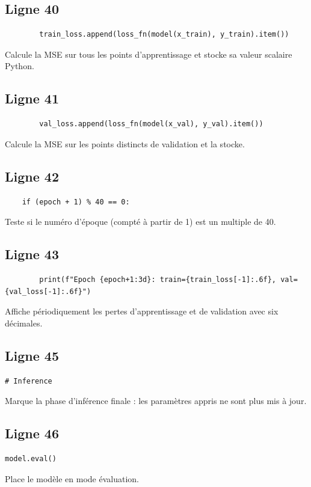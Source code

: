 \documentclass[11pt,a4paper]{article}
\begin{document}
\subsection*{Ligne 40}
\begin{lstlisting}
        train_loss.append(loss_fn(model(x_train), y_train).item())
\end{lstlisting}
Calcule la MSE sur tous les points d'apprentissage et stocke sa valeur scalaire Python.

\subsection*{Ligne 41}
\begin{lstlisting}
        val_loss.append(loss_fn(model(x_val), y_val).item())
\end{lstlisting}
Calcule la MSE sur les points distincts de validation et la stocke.

\subsection*{Ligne 42}
\begin{lstlisting}
    if (epoch + 1) % 40 == 0:
\end{lstlisting}
Teste si le numéro d'époque (compté à partir de 1) est un multiple de 40.

\subsection*{Ligne 43}
\begin{lstlisting}
        print(f"Epoch {epoch+1:3d}: train={train_loss[-1]:.6f}, val={val_loss[-1]:.6f}")
\end{lstlisting}
Affiche périodiquement les pertes d'apprentissage et de validation avec six décimales.

\subsection*{Ligne 45}
\begin{lstlisting}
# Inference
\end{lstlisting}
Marque la phase d'inférence finale : les paramètres appris ne sont plus mis à jour.

\subsection*{Ligne 46}
\begin{lstlisting}
model.eval()
\end{lstlisting}
Place le modèle en mode évaluation.
\end{document}
